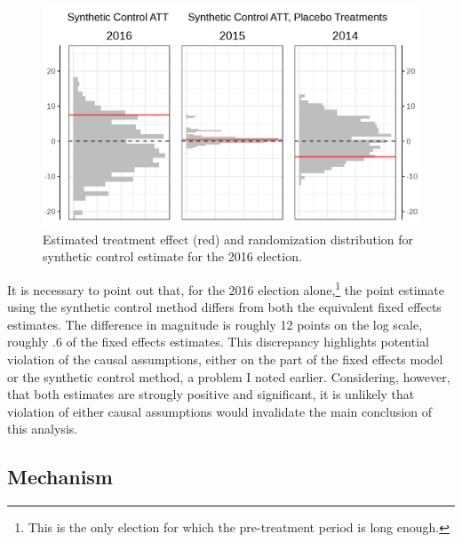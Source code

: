 \documentclass[12pt]{article}\usepackage[]{graphicx}\usepackage[]{color}
\newcommand{\1}{\mathbbm{1}}
\begin{document}
\begin{figure}[!htbp]
	\centering
	\includegraphics[width=\textwidth]{figure/SYP_Synth.png}
	\captionsetup{singlelinecheck=off}
	\caption[Estimated treatment effects for Synthetic Control]{Estimated treatment effect (red) and randomization distribution for synthetic control estimate for the 2016 election.}
	\label{fig:Synth}
\end{figure}

It is necessary to point out that, for the 2016 election alone,\footnote{This is the only election for which the pre-treatment period is long enough.} the point estimate using the synthetic control method differs from both the equivalent fixed effects estimates. The difference in magnitude is roughly 12 points on the log scale, roughly .6 of the fixed effects estimates. This discrepancy highlights potential violation of the causal assumptions, either on the part of the fixed effects model or the synthetic control method, a problem I noted earlier. Considering, however, that both estimates are strongly positive and significant, it is unlikely that violation of either causal assumptions would invalidate the main conclusion of this analysis.

\subsection{Mechanism}
\end{document}
